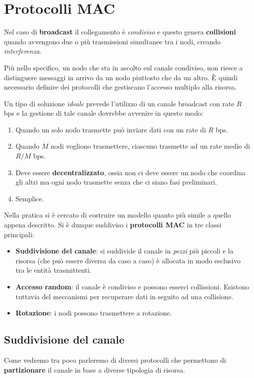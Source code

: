 \section{Protocolli MAC}
Nel caso di \textbf{broadcast} il collegamento è \emph{condiviso} e
questo genera \textbf{collisioni} quando avvengono due o più 
trasmissioni simultanee tra i nodi, creando \emph{interferenza}.

Più nello specifico, un nodo che sta in ascolto sul canale condiviso,
non riesce a distinguere messaggi in arrivo da un nodo piuttosto che
da un altro. \`E quindi necessario definire dei protocolli che 
gestiscano l'accesso multiplo alla risorsa.

Un tipo di soluzione \emph{ideale} prevede l'utilizzo di un canale 
broadcast con rate $R$ bps e la gestione di tale canale dovrebbe 
avvenire in questo modo:
\begin{enumerate}
	\item Quando un solo nodo trasmette può inviare dati con un rate 
		di $R$ bps.
	\item Quando $M$ nodi vogliono trasmettere, ciascuno trasmette ad
		un rate medio di $R / M$ bps.
	\item Deve essere \textbf{decentralizzato}, ossia non ci deve
		essere un nodo che coordina gli altri ma ogni nodo trasmette
		senza che ci siano fasi preliminari.
	\item Semplice.
\end{enumerate}
Nella pratica si è cercato di costruire un modello quanto più simile
a quello appena descritto. Si è dunque suddiviso i \textbf{protocolli
MAC} in tre classi principali:
\begin{itemize}
	\item \textbf{Suddivisione del canale}: si suddivide il canale
		in \emph{pezzi} più piccoli e la risorsa (che può essere 
		diversa da caso a caso) è allocata in modo esclusivo tra le
		entità trasmittenti.
	\item \textbf{Accesso random}: il canale è condiviso e possono 
		esserci collissioni. Esistono tuttavia del meccanismi per
		recuperare dati in seguito ad una collisione.
	\item \textbf{Rotazione}: i nodi possono trasmettere a rotazione.
\end{itemize}

\subsection{Suddivisione del canale}
Come vedremo tra poco parleremo di diversi protocolli che permettono
di \textbf{partizionare} il canale in base a diverse tipologia di
risorsa.

